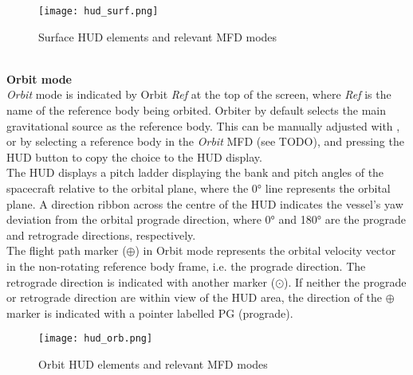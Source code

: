 \documentclass[Orbiter User Manual.tex]{subfiles}
\begin{document}
\begin{figure}[H]
  \centering
  \texttt{[image: hud\_surf.png]}
  \caption{Surface HUD elements and relevant MFD modes}
\end{figure}

\noindent
\\
\textbf{Orbit mode}\\
\textit{Orbit} mode is indicated by Orbit \textit{Ref} at the top of the screen, where \textit{Ref} is the name of the reference body being orbited. Orbiter by default selects the main gravitational source as the reference body. This can be manually adjusted with \Ctrl{}, or by selecting a reference body in the \textit{Orbit} MFD (see TODO), and pressing the HUD button to copy the choice to the HUD display.\\
The HUD displays a pitch ladder displaying the bank and pitch angles of the spacecraft relative to the orbital plane, where the 0° line represents the orbital plane. A direction ribbon across the centre of the HUD indicates the vessel's yaw deviation from the orbital prograde direction, where 0° and 180° are the prograde and retrograde directions, respectively.\\
The flight path marker ($\oplus$) in Orbit mode represents the orbital velocity vector in the non-rotating reference body frame, i.e. the prograde direction. The retrograde direction is indicated with another marker ($\odot$). If neither the prograde or retrograde direction are within view of the HUD area, the direction of the $\oplus$ marker is indicated with a pointer labelled PG (prograde).

\begin{figure}[H]
  \centering
  \texttt{[image: hud\_orb.png]}
  \caption{Orbit HUD elements and relevant MFD modes}
\end{figure}
\end{document}
